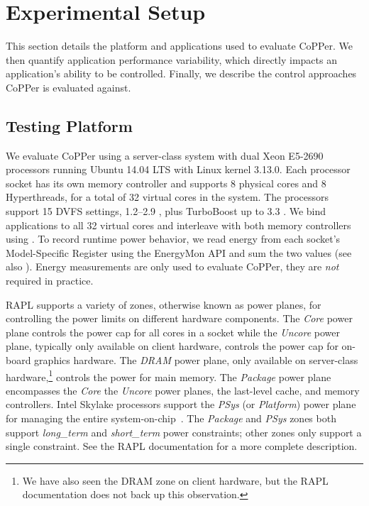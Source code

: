 \section{Experimental Setup}
\label{sec:copper-usage}

This section details the platform and applications used to evaluate CoPPer.
We then quantify application performance variability, which directly impacts an application's ability to be controlled.
Finally, we describe the control approaches CoPPer is evaluated against.

\subsection{Testing Platform}

We evaluate CoPPer using a server-class system with dual Xeon E5-2690 processors running Ubuntu 14.04 LTS with Linux kernel 3.13.0.
Each processor socket has its own memory controller and supports 8 physical cores and 8 Hyperthreads, for a total of 32 virtual cores in the system.
The processors support 15 DVFS settings, 1.2--2.9 \GHz, plus TurboBoost up to 3.3 \GHz.
We bind applications to all 32 virtual cores and interleave with both memory controllers using .
To record runtime power behavior, we read energy from each socket's Model-Specific Register using the EnergyMon API and sum the two values \cite{energymon,SandyBridge} (see also ).
Energy measurements are only used to evaluate CoPPer, they are \emph{not} required in practice.

RAPL supports a variety of zones, otherwise known as power planes, for controlling the power limits on different hardware components.
The \emph{Core} power plane controls the power cap for all cores in a socket while the \emph{Uncore} power plane, typically only available on client hardware, controls the power cap for on-board graphics hardware.
The \emph{DRAM} power plane, only available on server-class hardware,\footnote{We have also seen the DRAM zone on client hardware, but the RAPL documentation does not back up this observation.} controls the power for main memory.
The \emph{Package} power plane encompasses the \emph{Core} the \emph{Uncore} power planes, the last-level cache, and memory controllers.
Intel Skylake processors support the \emph{PSys} (or \emph{Platform}) power plane for managing the entire system-on-chip~\cite{skylake}.
The \emph{Package} and \emph{PSys} zones both support \emph{long\_term} and \emph{short\_term} power constraints; other zones only support a single constraint.
See the RAPL documentation for a more complete description.

